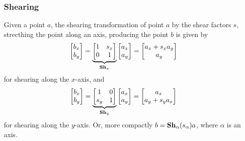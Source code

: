 \documentclass[11pt]{article}
\begin{document}
\begin{multicols}{2}
    \subsubsection{Shearing}
    Given a point $a$, the shearing transformation of point $a$ by the shear
    factors $s$, strecthing the point along an axis, producing the point $b$
    is given by
    \small
    \begin{align}
        \begin{bmatrix}
            b_x \\
            b_y
        \end{bmatrix}
        &=
        \underbrace{
        \begin{bmatrix}
            1 & s_x \\
            0 & 1 \\
        \end{bmatrix}
        }_{\text{\bf Sh}_x}
        \begin{bmatrix}
            a_x \\
            a_y
        \end{bmatrix}
        =
        \begin{bmatrix}
            a_x + s_x a_y\\
            a_y \\
        \end{bmatrix}
    \end{align}
    \normalsize
    for shearing along the $x$-axis, and
    \small
    \begin{align}
        \begin{bmatrix}
            b_x \\
            b_y
        \end{bmatrix}
        &=
        \underbrace{
        \begin{bmatrix}
            1   & 0 \\
            s_y & 1 \\
        \end{bmatrix}
        }_{\text{\bf Sh}_y}
        \begin{bmatrix}
            a_x \\
            a_y
        \end{bmatrix}
        =
        \begin{bmatrix}
            a_x \\
            a_y + s_y a_x \\
        \end{bmatrix}
    \end{align}
    \normalsize
    for shearing along the $y$-axis. Or, more compactly $b = \text{\bf
    Sh}_\alpha(s_\alpha) a$, where $\alpha$ is an axis.
    
\end{multicols}
\end{document}
